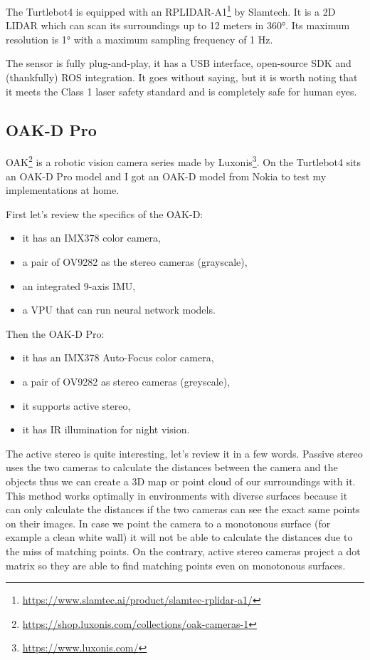 The Turtlebot4 is equipped with an RPLIDAR-A1\footnote{\url{https://www.slamtec.ai/product/slamtec-rplidar-a1/}} by Slamtech. It is a 2D LIDAR which can scan its surroundings up to 12 meters in 360°. Its maximum resolution is 1° with a maximum sampling frequency of 1 Hz.

The sensor is fully plug-and-play, it has a USB interface, open-source SDK and (thankfully) ROS integration. It goes without saying, but it is worth noting that it meets the Class 1 laser safety standard and is completely safe for human eyes\cite{LaserSafety}.

\subsection{OAK-D Pro}

OAK\footnote{\url{https://shop.luxonis.com/collections/oak-cameras-1}} is a robotic vision camera series made by Luxonis\footnote{\url{https://www.luxonis.com/}}. On the Turtlebot4 sits an OAK-D Pro model and I got an OAK-D model from Nokia to test my implementations at home.

First let's review the specifics of the OAK-D:
\begin{itemize}
    \item it has an IMX378 color camera,
    \item a pair of OV9282 as the stereo cameras (grayscale),
    \item an integrated 9-axis IMU,
    \item a VPU that can run neural network models.
\end{itemize}

Then the OAK-D Pro:
\begin{itemize}
    \item it has an IMX378 Auto-Focus color camera,
    \item a pair of OV9282 as stereo cameras (greyscale),
    \item it supports active stereo,
    \item it has IR illumination for night vision.
\end{itemize}
The active stereo\cite{Stereo} is quite interesting, let's review it in a few words. Passive stereo uses the two cameras to calculate the distances between the camera and the objects thus we can create a 3D map or point cloud of our surroundings with it. This method works optimally in environments with diverse surfaces because it can only calculate the distances if the two cameras can see the exact same points on their images. In case we point the camera to a monotonous surface (for example a clean white wall) it will not be able to calculate the distances due to the miss of matching points. On the contrary, active stereo cameras project a dot matrix so they are able to find matching points even on monotonous surfaces.

